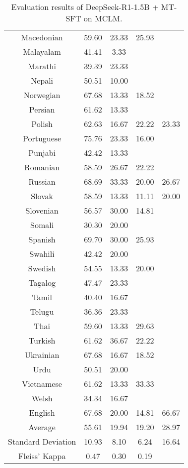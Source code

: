\begin{table*}[]
\begin{tabular}{c|cccc}
Macedonian & 59.60 & 23.33 & 25.93 &  \\
Malayalam & 41.41 & 3.33 & \multicolumn{1}{l}{} &  \\
Marathi & 39.39 & 23.33 & \multicolumn{1}{l}{} &  \\
Nepali & 50.51 & 10.00 & \multicolumn{1}{l}{} &  \\
Norwegian & 67.68 & 13.33 & 18.52 &  \\
Persian & 61.62 & 13.33 & \multicolumn{1}{l}{} &  \\
Polish & 62.63 & 16.67 & 22.22 & 23.33 \\
Portuguese & 75.76 & 23.33 & 16.00 &  \\
Punjabi & 42.42 & 13.33 & \multicolumn{1}{l}{} &  \\
Romanian & 58.59 & 26.67 & 22.22 &  \\
Russian & 68.69 & 33.33 & 20.00 & 26.67 \\
Slovak & 58.59 & 13.33 & 11.11 & 20.00 \\
Slovenian & 56.57 & 30.00 & 14.81 &  \\
Somali & 30.30 & 20.00 & \multicolumn{1}{l}{} &  \\
Spanish & 69.70 & 30.00 & 25.93 &  \\
Swahili & 42.42 & 20.00 & \multicolumn{1}{l}{} &  \\
Swedish & 54.55 & 13.33 & 20.00 &  \\
Tagalog & 47.47 & 23.33 & \multicolumn{1}{l}{} &  \\
Tamil & 40.40 & 16.67 & \multicolumn{1}{l}{} &  \\
Telugu & 36.36 & 23.33 & \multicolumn{1}{l}{} &  \\
Thai & 59.60 & 13.33 & 29.63 &  \\
Turkish & 61.62 & 36.67 & 22.22 &  \\
Ukrainian & 67.68 & 16.67 & 18.52 &  \\
Urdu & 50.51 & 20.00 & \multicolumn{1}{l}{} &  \\
Vietnamese & 61.62 & 13.33 & 33.33 &  \\
Welsh & 34.34 & 16.67 & \multicolumn{1}{l}{} &  \\
\rowcolor[HTML]{FCE5CD} 
English & 67.68 & 20.00 & 14.81 & 66.67 \\ \midrule
Average & 55.61 & 19.94 & 19.20 & 28.97 \\
Standard Deviation & 10.93 & 8.10 & 6.24 & 16.64 \\
Fleiss' Kappa & 0.47 & 0.30 & 0.19 & \\ \bottomrule
\end{tabular}
\caption{\footnotesize Evaluation results of DeepSeek-R1-1.5B + MT-SFT on MCLM.}
\label{tab:deepseek_r1_1_5B_mt_sft}
\end{table*}

